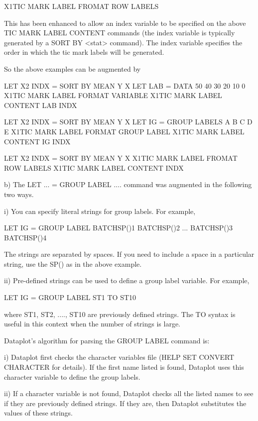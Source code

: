 {          X1TIC MARK LABEL FROMAT ROW LABELS

       This has been enhanced to allow an index variable to
       be specified on the above TIC MARK LABEL CONTENT
       commands (the index variable is typically generated by
       a SORT BY <stat> command).  The index variable specifies
       the order in which the tic mark labels will be generated.
    
       So the above examples can be augmented by

          LET X2 INDX = SORT BY MEAN Y X
          LET LAB = DATA 50 40 30 20 10 0
          X1TIC MARK LABEL FORMAT VARIABLE
          X1TIC MARK LABEL CONTENT LAB INDX

          LET X2 INDX = SORT BY MEAN Y X
          LET IG = GROUP LABELS A B C D E
          X1TIC MARK LABEL FORMAT GROUP LABEL
          X1TIC MARK LABEL CONTENT IG INDX

          LET X2 INDX = SORT BY MEAN Y X
          X1TIC MARK LABEL FROMAT ROW LABELS
          X1TIC MARK LABEL CONTENT INDX

    b) The LET ... = GROUP LABEL .... command was augmented in
       the following two ways.

        i) You can specify literal strings for group labels.
           For example,

              LET IG = GROUP LABEL  BATCHSP()1 BATCHSP()2 ...
                       BATCHSP()3 BATCHSP()4

           The strings are separated by spaces.  If you need to
           include a space in a particular string, use the
           SP() as in the above example.

       ii) Pre-defined strings can be used to define a group
           label variable.  For example,

              LET IG = GROUP LABEL ST1 TO ST10

           where ST1, ST2, ...., ST10 are previously defined
           strings.  The TO syntax is useful in this context
           when the number of strings is large.
        
       Dataplot's algorithm for parsing the GROUP LABEL command
       is:

         i) Dataplot first checks the character variables file
            (HELP SET CONVERT CHARACTER for details).  If the
            first name listed is found, Dataplot uses this
            character variable to define the group labels.
 
        ii) If a character variable is not found, Dataplot
            checks all the listed names to see if they are
            previously defined strings.  If they are, then
            Dataplot substitutes the values of these strings.
 
}
